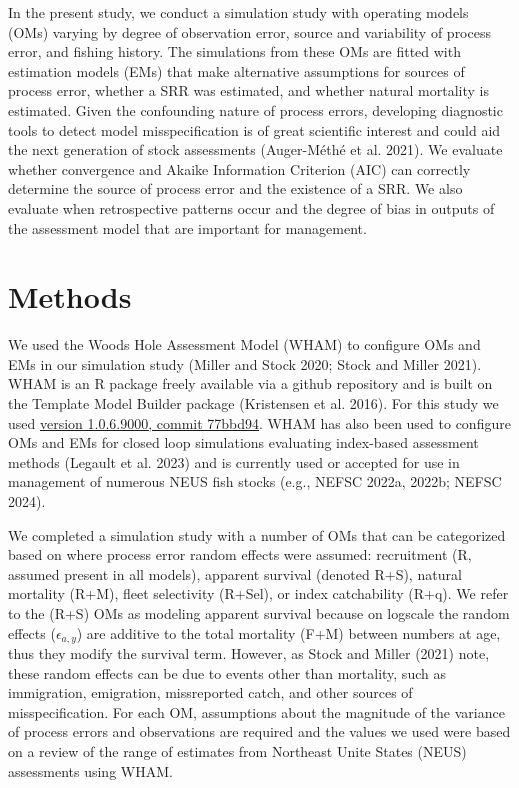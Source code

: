 \documentclass[
  12pt,
]{article}
\begin{document}
In the present study, we conduct a simulation study with operating
models (OMs) varying by degree of observation error, source and
variability of process error, and fishing history. The simulations from
these OMs are fitted with estimation models (EMs) that make alternative
assumptions for sources of process error, whether a SRR was estimated,
and whether natural mortality is estimated. Given the confounding nature
of process errors, developing diagnostic tools to detect model
misspecification is of great scientific interest and could aid the next
generation of stock assessments (Auger-Méthé et al. 2021). We evaluate
whether convergence and Akaike Information Criterion (AIC) can correctly
determine the source of process error and the existence of a SRR. We
also evaluate when retrospective patterns occur and the degree of bias
in outputs of the assessment model that are important for management.

\section*{Methods}\label{methods}

We used the Woods Hole Assessment Model (WHAM) to configure OMs and EMs
in our simulation study (Miller and Stock 2020; Stock and Miller 2021).
WHAM is an R package freely available via a github repository and is
built on the Template Model Builder package (Kristensen et al. 2016).
For this study we used
\href{https://github.com/timjmiller/wham/tree/77bbd946e4881216a439933473d1c58b21c270c3}{version
1.0.6.9000, commit 77bbd94}. WHAM has also been used to configure OMs
and EMs for closed loop simulations evaluating index-based assessment
methods (Legault et al. 2023) and is currently used or accepted for use
in management of numerous NEUS fish stocks (e.g., NEFSC 2022a, 2022b;
NEFSC 2024).

We completed a simulation study with a number of OMs that can be
categorized based on where process error random effects were assumed:
recruitment (R, assumed present in all models), apparent survival
(denoted R+S), natural mortality (R+M), fleet selectivity (R+Sel), or
index catchability (R+q). We refer to the (R+S) OMs as modeling apparent
survival because on logscale the random effects (\(\epsilon_{a,y}\)) are
additive to the total mortality (F+M) between numbers at age, thus they
modify the survival term. However, as Stock and Miller (2021) note,
these random effects can be due to events other than mortality, such as
immigration, emigration, missreported catch, and other sources of
misspecification. For each OM, assumptions about the magnitude of the
variance of process errors and observations are required and the values
we used were based on a review of the range of estimates from Northeast
Unite States (NEUS) assessments using WHAM.
\end{document}
